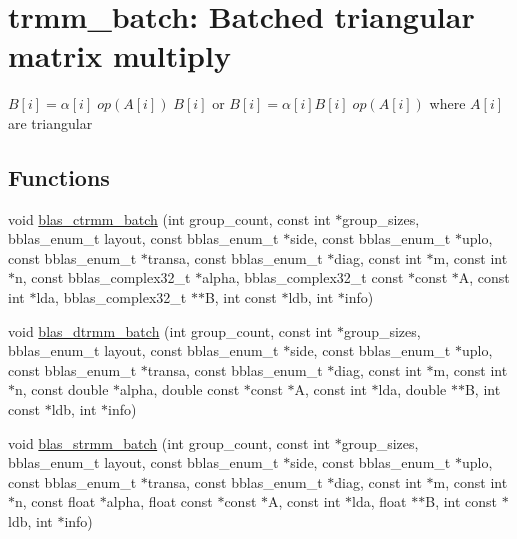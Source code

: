 \hypertarget{group__trmm__batch}{}\section{trmm\+\_\+batch\+: Batched triangular matrix multiply}
\label{group__trmm__batch}


$ B[i] = \alpha[i] \;op(A[i])\; B[i] $ or $ B[i] = \alpha[i] B[i] \;op(A[i]) $ where $ A[i] $ are triangular  


\subsection*{Functions}
\begin{DoxyCompactItemize}
\item 
void \mbox{\hyperlink{group__trmm__batch_ga0f7874ec940542213e4676fdb45fad49}{blas\+\_\+ctrmm\+\_\+batch}} (int group\+\_\+count, const int $\ast$group\+\_\+sizes, bblas\+\_\+enum\+\_\+t layout, const bblas\+\_\+enum\+\_\+t $\ast$side, const bblas\+\_\+enum\+\_\+t $\ast$uplo, const bblas\+\_\+enum\+\_\+t $\ast$transa, const bblas\+\_\+enum\+\_\+t $\ast$diag, const int $\ast$m, const int $\ast$n, const bblas\+\_\+complex32\+\_\+t $\ast$alpha, bblas\+\_\+complex32\+\_\+t const $\ast$const $\ast$A, const int $\ast$lda, bblas\+\_\+complex32\+\_\+t $\ast$$\ast$B, int const $\ast$ldb, int $\ast$info)
\item 
void \mbox{\hyperlink{group__trmm__batch_ga8b6216cfe24af976ee344f94dacd6e9d}{blas\+\_\+dtrmm\+\_\+batch}} (int group\+\_\+count, const int $\ast$group\+\_\+sizes, bblas\+\_\+enum\+\_\+t layout, const bblas\+\_\+enum\+\_\+t $\ast$side, const bblas\+\_\+enum\+\_\+t $\ast$uplo, const bblas\+\_\+enum\+\_\+t $\ast$transa, const bblas\+\_\+enum\+\_\+t $\ast$diag, const int $\ast$m, const int $\ast$n, const double $\ast$alpha, double const $\ast$const $\ast$A, const int $\ast$lda, double $\ast$$\ast$B, int const $\ast$ldb, int $\ast$info)
\item 
void \mbox{\hyperlink{group__trmm__batch_ga2c83d184ed54d501cdcc35bccdee8306}{blas\+\_\+strmm\+\_\+batch}} (int group\+\_\+count, const int $\ast$group\+\_\+sizes, bblas\+\_\+enum\+\_\+t layout, const bblas\+\_\+enum\+\_\+t $\ast$side, const bblas\+\_\+enum\+\_\+t $\ast$uplo, const bblas\+\_\+enum\+\_\+t $\ast$transa, const bblas\+\_\+enum\+\_\+t $\ast$diag, const int $\ast$m, const int $\ast$n, const float $\ast$alpha, float const $\ast$const $\ast$A, const int $\ast$lda, float $\ast$$\ast$B, int const $\ast$ldb, int $\ast$info)
$$
\end{DoxyCompactItemize}
